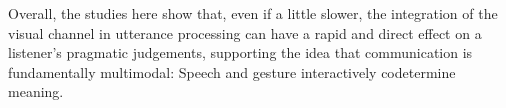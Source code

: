 \documentclass[a4paper,man,natbib]{apa6}
\begin{document}
Overall, the studies here show that, even if a little slower, the integration of the visual channel in utterance processing can have a rapid and direct effect on a listener's pragmatic judgements, supporting the idea that communication is fundamentally multimodal: 
Speech and gesture interactively codetermine meaning.


\end{document}
